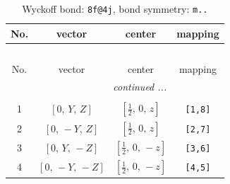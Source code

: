 \documentclass[fleqn,8pt]{jsarticle}
\begin{document}
\renewcommand{\arraystretch}{1.2}
\begin{longtable}{cccc}
\caption{Wyckoff bond: {\tt 8f@4j}, bond symmetry: {\tt m..}}
 \\
 \hline \hline
No. & vector & center & mapping \\ \hline \endfirsthead

\multicolumn{3}{l}{\tablename\ \thetable{}} \\
 \hline \hline
No. & vector & center & mapping \\ \hline \endhead

 \hline \hline
\multicolumn{3}{r}{\footnotesize\it continued ...} \\ \endfoot

 \hline \hline
\multicolumn{3}{r}{} \\ \endlastfoot

1 & $\left[ 0,\, Y,\, Z \right]$ & $\left[ \frac{1}{2},\, 0,\, z \right]$ & {\tt [1,8]} \\ \hline
2 & $\left[ 0,\, - Y,\, Z \right]$ & $\left[ \frac{1}{2},\, 0,\, z \right]$ & {\tt [2,7]} \\ \hline
3 & $\left[ 0,\, Y,\, - Z \right]$ & $\left[ \frac{1}{2},\, 0,\, - z \right]$ & {\tt [3,6]} \\ \hline
4 & $\left[ 0,\, - Y,\, - Z \right]$ & $\left[ \frac{1}{2},\, 0,\, - z \right]$ & {\tt [4,5]} \\
\end{longtable}
\renewcommand{\arraystretch}{1.2}
\end{document}
